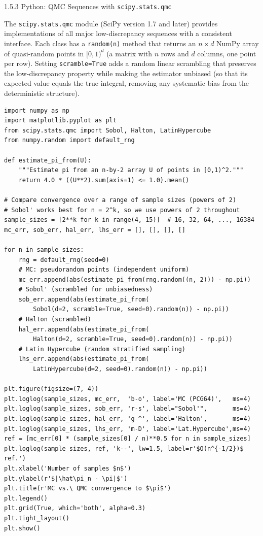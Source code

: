 \documentclass[aspectratio=169,10pt]{beamer}
\begin{document}
\begin{frame}[fragile]{1.5.3 Python: QMC Sequences with \texttt{scipy.stats.qmc}}

  The \texttt{scipy.stats.qmc} module (SciPy version 1.7 and later) provides
  implementations of all major low-discrepancy sequences with a consistent
  interface.  Each class has a \texttt{random(n)} method that returns an
  $n \times d$ NumPy array of quasi-random points in $[0,1)^d$ (a matrix with
  $n$ rows and $d$ columns, one point per row).  Setting \texttt{scramble=True}
  adds a random linear scrambling that preserves the low-discrepancy property
  while making the estimator unbiased (so that its expected value equals the
  true integral, removing any systematic bias from the deterministic structure).

\begin{lstlisting}[style=python]
import numpy as np
import matplotlib.pyplot as plt
from scipy.stats.qmc import Sobol, Halton, LatinHypercube
from numpy.random import default_rng

def estimate_pi_from(U):
    """Estimate pi from an n-by-2 array U of points in [0,1)^2."""
    return 4.0 * ((U**2).sum(axis=1) <= 1.0).mean()

# Compare convergence over a range of sample sizes (powers of 2)
# Sobol' works best for n = 2^k, so we use powers of 2 throughout
sample_sizes = [2**k for k in range(4, 15)]  # 16, 32, 64, ..., 16384
mc_err, sob_err, hal_err, lhs_err = [], [], [], []

for n in sample_sizes:
    rng = default_rng(seed=0)
    # MC: pseudorandom points (independent uniform)
    mc_err.append(abs(estimate_pi_from(rng.random((n, 2))) - np.pi))
    # Sobol' (scrambled for unbiasedness)
    sob_err.append(abs(estimate_pi_from(
        Sobol(d=2, scramble=True, seed=0).random(n)) - np.pi))
    # Halton (scrambled)
    hal_err.append(abs(estimate_pi_from(
        Halton(d=2, scramble=True, seed=0).random(n)) - np.pi))
    # Latin Hypercube (random stratified sampling)
    lhs_err.append(abs(estimate_pi_from(
        LatinHypercube(d=2, seed=0).random(n)) - np.pi))

plt.figure(figsize=(7, 4))
plt.loglog(sample_sizes, mc_err,  'b-o', label='MC (PCG64)',   ms=4)
plt.loglog(sample_sizes, sob_err, 'r-s', label="Sobol'",       ms=4)
plt.loglog(sample_sizes, hal_err, 'g-^', label='Halton',       ms=4)
plt.loglog(sample_sizes, lhs_err, 'm-D', label='Lat.Hypercube',ms=4)
ref = [mc_err[0] * (sample_sizes[0] / n)**0.5 for n in sample_sizes]
plt.loglog(sample_sizes, ref, 'k--', lw=1.5, label=r'$O(n^{-1/2})$ ref.')
plt.xlabel('Number of samples $n$')
plt.ylabel(r'$|\hat\pi_n - \pi|$')
plt.title(r'MC vs.\ QMC convergence to $\pi$')
plt.legend()
plt.grid(True, which='both', alpha=0.3)
plt.tight_layout()
plt.show()
\end{lstlisting}

\end{frame}
\end{document}
